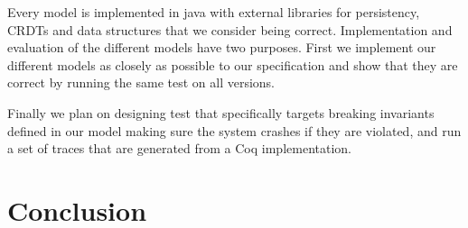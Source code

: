 \documentclass[systeme,french,english]{compas2022}
\begin{document}
Every model is implemented in java with external libraries for persistency, CRDTs and data structures that we consider being correct.
Implementation and evaluation of the different models have two purposes.
First we implement our different models as closely as possible to our specification and show that they are correct by running the same test on all versions.

Finally we plan on designing test that specifically targets breaking invariants defined in our model making sure the system crashes if they are violated, and run a set of traces that are generated from a Coq implementation.



\section{Conclusion}



\end{document}
